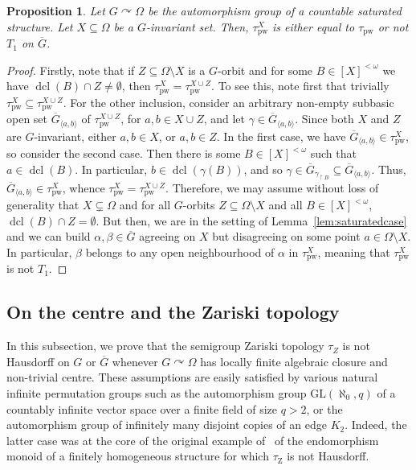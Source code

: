 \documentclass{article}
\newtheorem{prop}[theorem]{Proposition}
\theoremstyle{remark}
\theoremstyle{definition}
\def\acts{\curvearrowright}
\DeclareMathOperator{\dcl}{dcl}
\def\G{\overline{G}}
\newcommand{\pw}[0]{\tau_{\mathrm{pw}}}
\newcommand{\zar}[0]{\tau_{\mathrm{Z}}}
\newcommand{\fps}[1]{[#1]^{<\omega}}
\begin{document}
{{{{{\begin{prop}\label{prop:localized are not T1}
    Let $G\acts\Omega$ be the automorphism group of a countable saturated structure. Let $X\subseteq\Omega$ be a $G$-invariant set. Then, $\pw^X$ is either equal to $\pw$ or not $T_{1}$ on $\overline{G}$. 
\end{prop}
\begin{proof} Firstly, note that if $Z\subseteq\Omega\setminus X$ is a $G$-orbit and for some $B\in[X]^{<\omega}$ we have  $\dcl(B)\cap Z\neq \emptyset$, then $\pw^{X}=\pw^{X\cup Z}$. {To see this, note first that trivially $\pw^{X}\subseteq \pw^{X\cup Z}$. For the other inclusion,   consider an arbitrary non-empty subbasic open   set %
$\G_{\langle a, b\rangle}$
of $\pw^{X\cup Z}$, %
for $a,b\in X\cup Z$,  and let $\gamma\in \G_{\langle a, b\rangle}$. Since both $X$ and $Z$ are $G$-invariant, either $a,b\in X$, or $a,b\in Z$. In the first case, we have $\G_{\langle a, b\rangle}\in \pw^X$, so consider  the second case. Then there is some $B\in\fps{X}$ such that $a\in\dcl(B)$. In particular,  $b\in\dcl(\gamma(B))$, and so $\gamma\in\G_{\gamma_{\upharpoonright B}}\subseteq \G_{\langle a, b\rangle}$. Thus, $\G_{\langle a, b\rangle}\in \pw^X$,  whence  $\pw^X=\pw^{X\cup Z}$.} Therefore, we may assume without loss of generality that $X\subsetneq \Omega$ and for all $G$-orbits $Z\subseteq\Omega\setminus X$ and all $B\in[X]^{<\omega}$, $\dcl(B)\cap Z=\emptyset$. But then, we are in the setting of Lemma~\ref{lem:saturatedcase} and we can build $\alpha, \beta\in\overline{G}$ agreeing on $X$ but disagreeing on some point $a\in\Omega\setminus X$. In particular, $\beta$ belongs to any open neighbourhood of $\alpha$ in $\pw^X$, meaning that $\pw^X$ is not $T_{1}$.
\end{proof}


\subsection{On the centre and the Zariski topology}\label{sub:zar}

In this subsection, we prove that the semigroup Zariski topology $\tau_Z$ is not Hausdorff on $G$ or $\overline{G}$ whenever $G\acts\Omega$ has locally finite algebraic closure and non-trivial centre. These assumptions are easily satisfied by various natural infinite permutation groups such as the automorphism group $\mathrm{GL}(\aleph_0, q)$ of a countably infinite vector space over a finite field of size $q>2$, or the automorphism group of infinitely many disjoint copies of an edge $K_2$. Indeed, the latter case was at the core of the original example of~\cite{pinskerschindler} of the endomorphism monoid of a finitely homogeneous structure  for which $\zar$ is not Hausdorff.\\ %

}}}}}
\end{document}
